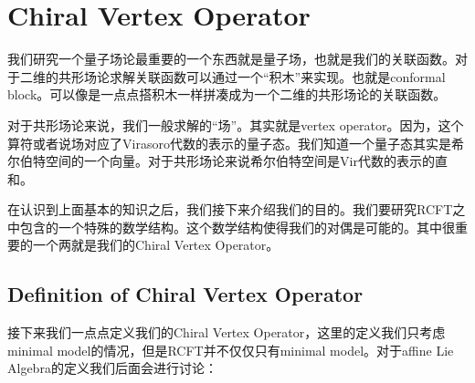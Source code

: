 
\section{Chiral Vertex Operator}
我们研究一个量子场论最重要的一个东西就是量子场，也就是我们的关联函数。对于二维的共形场论求解关联函数可以通过一个“积木”来实现。也就是conformal block。可以像是一点点搭积木一样拼凑成为一个二维的共形场论的关联函数。

对于共形场论来说，我们一般求解的“场”。其实就是vertex operator。因为，这个算符或者说场对应了Virasoro代数的表示的量子态。我们知道一个量子态其实是希尔伯特空间的一个向量。对于共形场论来说希尔伯特空间是Vir代数的表示的直和。

在认识到上面基本的知识之后，我们接下来介绍我们的目的。我们要研究RCFT之中包含的一个特殊的数学结构。这个数学结构使得我们的对偶是可能的。其中很重要的一个两就是我们的Chiral Vertex Operator。

\subsection{Definition of Chiral Vertex Operator}


接下来我们一点点定义我们的Chiral Vertex Operator，这里的定义我们只考虑minimal model的情况，但是RCFT并不仅仅只有minimal model。对于affine Lie Algebra的定义我们后面会进行讨论：


